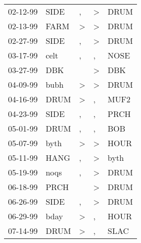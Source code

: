 \begin{supertabular}{p{0.07\textwidth}p{0.06\textwidth}p{0.02\textwidth}p{0.02\textwidth}p{0.06\textwidth}}
 02-12-99\textsuperscript{} &  SIDE\textsuperscript{} &             , &  \textgreater &  DRUM\textsuperscript{} \\
 02-13-99\textsuperscript{} &  FARM\textsuperscript{} &  \textgreater &  \textgreater &  DRUM\textsuperscript{} \\
 02-27-99\textsuperscript{} &  SIDE\textsuperscript{} &             , &  \textgreater &  DRUM\textsuperscript{} \\
 03-17-99\textsuperscript{} &  celt\textsuperscript{} &             , &             , &  NOSE\textsuperscript{} \\
 03-27-99\textsuperscript{} &   DBK\textsuperscript{} &               &  \textgreater &   DBK\textsuperscript{} \\
 04-09-99\textsuperscript{} &  bubh\textsuperscript{} &  \textgreater &  \textgreater &  DRUM\textsuperscript{} \\
 04-16-99\textsuperscript{} &  DRUM\textsuperscript{} &  \textgreater &             , &  MUF2\textsuperscript{} \\
 04-23-99\textsuperscript{} &  SIDE\textsuperscript{} &             , &             , &  PRCH\textsuperscript{} \\
 05-01-99\textsuperscript{} &  DRUM\textsuperscript{} &             , &             , &   BOB\textsuperscript{} \\
 05-07-99\textsuperscript{} &  byth\textsuperscript{} &  \textgreater &  \textgreater &  HOUR\textsuperscript{} \\
 05-11-99\textsuperscript{} &  HANG\textsuperscript{} &             , &  \textgreater &  byth\textsuperscript{} \\
 05-19-99\textsuperscript{} &  noqs\textsuperscript{} &             , &  \textgreater &  DRUM\textsuperscript{} \\
 06-18-99\textsuperscript{} &  PRCH\textsuperscript{} &               &  \textgreater &  DRUM\textsuperscript{} \\
 06-26-99\textsuperscript{} &  SIDE\textsuperscript{} &             , &  \textgreater &  DRUM\textsuperscript{} \\
 06-29-99\textsuperscript{} &  bday\textsuperscript{} &  \textgreater &             , &  HOUR\textsuperscript{} \\
 07-14-99\textsuperscript{} &  DRUM\textsuperscript{} &  \textgreater &             , &  SLAC\textsuperscript{} \\

\end{supertabular}
